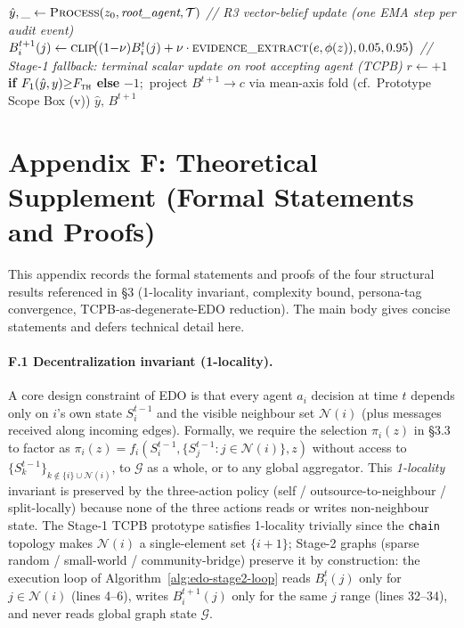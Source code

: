 \begin{algorithm}[!ht]
\begin{algorithmic}[1]
  \EndIf
\EndFunction
\State $\hat{y},\_ \gets \textsc{Process}(z_0, \textit{root\_agent}, \mathcal{T})$
\Statex \quad\textit{// R3 vector-belief update (one EMA step per audit event)}
  \State $B_i^{t{+}1}(j) \gets \textsc{clip}\!\big((1{-}\nu) B_i^{t}(j) + \nu\cdot \textsc{evidence\_extract}(e,\phi(z)),0.05,0.95\big)$
\EndFor
\Statex \quad\textit{// Stage-1 fallback: terminal scalar update on root accepting agent (TCPB)}
\State $r \gets {+}1$ \textbf{if} $F_1(\hat{y},y){\geq}F_{\textsc{th}}$ \textbf{else} ${-}1$;\, project $B^{t{+}1} \to c$ via mean-axis fold (cf.\ Prototype Scope Box (v))
\State \Return $\hat{y},\,B^{t+1}$
\end{algorithmic}
\end{algorithm}

\section*{Appendix F: Theoretical Supplement (Formal Statements and Proofs)}
\label{sec:appendix-f}

This appendix records the formal statements and proofs of the four structural results referenced in \S 3 (1-locality invariant, complexity bound, persona-tag convergence, TCPB-as-degenerate-EDO reduction). The main body gives concise statements and defers technical detail here.

\paragraph{F.1 Decentralization invariant (1-locality).} A core design constraint of EDO is that every agent $a_i$ decision at time $t$ depends only on $i$'s own state $S_i^{t-1}$ and the visible neighbour set $\mathcal{N}(i)$ (plus messages received along incoming edges). Formally, we require the selection $\pi_i(z)$ in \S 3.3 to factor as $\pi_i(z)=f_i(S_i^{t-1}, \{S_j^{t-1}: j\in\mathcal{N}(i)\}, z)$ without access to $\{S_k^{t-1}\}_{k\notin\{i\}\cup\mathcal{N}(i)}$, to $\mathcal{G}$ as a whole, or to any global aggregator. This \emph{1-locality} invariant is preserved by the three-action policy (self / outsource-to-neighbour / split-locally) because none of the three actions reads or writes non-neighbour state. The Stage-1 TCPB prototype satisfies 1-locality trivially since the \texttt{chain} topology makes $\mathcal{N}(i)$ a single-element set $\{i+1\}$; Stage-2 graphs (sparse random / small-world / community-bridge) preserve it by construction: the execution loop of Algorithm~\ref{alg:edo-stage2-loop} reads $B_i^t(j)$ only for $j\in\mathcal{N}(i)$ (lines 4--6), writes $B_i^{t+1}(j)$ only for the same $j$ range (lines 32--34), and never reads global graph state $\mathcal{G}$.

